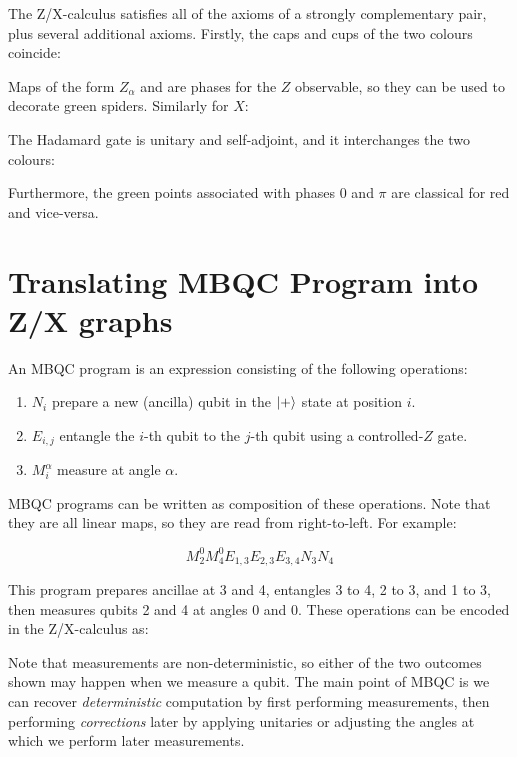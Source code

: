\documentclass{article}
\begin{document}
The Z/X-calculus satisfies all of the axioms of a strongly complementary pair, plus several additional axioms. Firstly, the caps and cups of the two colours coincide:

Maps of the form $Z_\alpha$ and are phases for the $Z$ observable, so they can be used to decorate green spiders. Similarly for $X$:

The Hadamard gate is unitary and self-adjoint, and it interchanges the two colours:
\begin{center}
  \qquad\qquad
\end{center}

Furthermore, the green points associated with phases $0$ and $\pi$ are classical for red and vice-versa.


\section{Translating MBQC Program into Z/X graphs}\label{sec:mbqc}

An MBQC program is an expression consisting of the following operations:

\begin{enumerate}
  \item $N_i$ prepare a new (ancilla) qubit in the $\left| + \right\rangle$ state at position $i$.
  \item $E_{i,j}$ entangle the $i$-th qubit to the $j$-th qubit using a controlled-$Z$ gate.
  \item $M_i^\alpha$ measure at angle $\alpha$.
\end{enumerate}

MBQC programs can be written as composition of these operations. Note that they are all linear maps, so they are read from right-to-left. For example:

\[ M_2^0 M_4^0 E_{1,3} E_{2,3} E_{3,4} N_3 N_4 \]

This program prepares ancillae at 3 and 4, entangles 3 to 4, 2 to 3, and 1 to 3, then measures qubits 2 and 4 at angles 0 and 0. These operations can be encoded in the Z/X-calculus as:

Note that measurements are non-deterministic, so either of the two outcomes shown may happen when we measure a qubit. The main point of MBQC is we can recover \textit{deterministic} computation by first performing measurements, then performing \textit{corrections} later by applying unitaries or adjusting the angles at which we perform later measurements.
\end{document}
